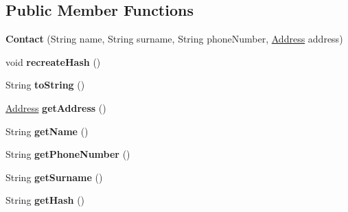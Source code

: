 \subsection*{Public Member Functions}
\begin{DoxyCompactItemize}
\item 
\mbox{\label{classcloud_1_1ptl_1_1persistence_1_1Contact_a9632e36b8155c5904e15ebf88a63319f}} 
{\bfseries Contact} (String name, String surname, String phone\+Number, \hyperlink{classcloud_1_1ptl_1_1persistence_1_1Address}{Address} address)
\item 
\mbox{\label{classcloud_1_1ptl_1_1persistence_1_1Contact_af936a2f94db71920c6c8cf52bc43af8c}} 
void {\bfseries recreate\+Hash} ()
\item 
\mbox{\label{classcloud_1_1ptl_1_1persistence_1_1Contact_a8e0732a83078d44c615ecc4740f50a76}} 
String {\bfseries to\+String} ()
\item 
\mbox{\label{classcloud_1_1ptl_1_1persistence_1_1Contact_afc86bebcb1976b7ee21adb71dbacb7da}} 
\hyperlink{classcloud_1_1ptl_1_1persistence_1_1Address}{Address} {\bfseries get\+Address} ()
\item 
\mbox{\label{classcloud_1_1ptl_1_1persistence_1_1Contact_a993d57bf28a4a2af65783a06ecb1db8e}} 
String {\bfseries get\+Name} ()
\item 
\mbox{\label{classcloud_1_1ptl_1_1persistence_1_1Contact_a9a599f3cb99c9cc02ff4fbc461e990c0}} 
String {\bfseries get\+Phone\+Number} ()
\item 
\mbox{\label{classcloud_1_1ptl_1_1persistence_1_1Contact_a0900199420419f679736980a90e87a6b}} 
String {\bfseries get\+Surname} ()
\item 
\mbox{\label{classcloud_1_1ptl_1_1persistence_1_1Contact_ae44a8c27686466703874c0654be883a9}} 
String {\bfseries get\+Hash} ()
\item 

\end{DoxyCompactItemize}

